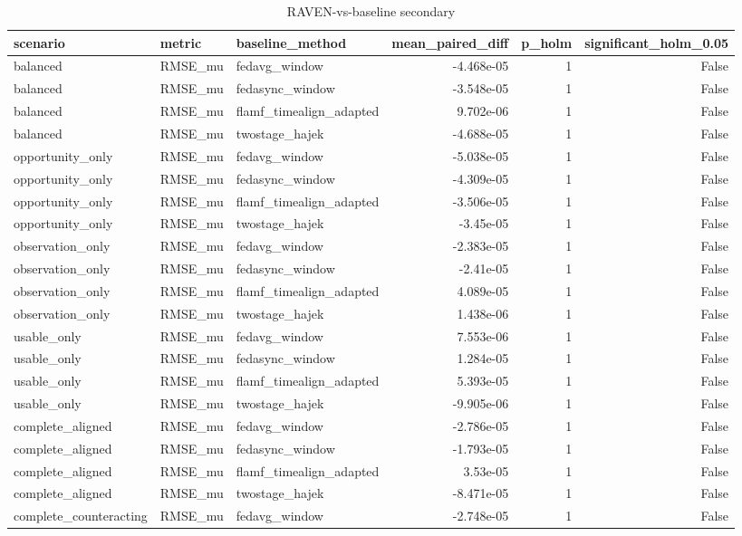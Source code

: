 \begin{table}
\caption{RAVEN-vs-baseline secondary}
\label{tab:table_e2f}
\begin{tabular}{lllrrr}
\toprule
scenario & metric & baseline_method & mean_paired_diff & p_holm & significant_holm_0.05 \\
\midrule
balanced & RMSE_mu & fedavg_window & -4.468e-05 & 1 & False \\
balanced & RMSE_mu & fedasync_window & -3.548e-05 & 1 & False \\
balanced & RMSE_mu & flamf_timealign_adapted & 9.702e-06 & 1 & False \\
balanced & RMSE_mu & twostage_hajek & -4.688e-05 & 1 & False \\
opportunity_only & RMSE_mu & fedavg_window & -5.038e-05 & 1 & False \\
opportunity_only & RMSE_mu & fedasync_window & -4.309e-05 & 1 & False \\
opportunity_only & RMSE_mu & flamf_timealign_adapted & -3.506e-05 & 1 & False \\
opportunity_only & RMSE_mu & twostage_hajek & -3.45e-05 & 1 & False \\
observation_only & RMSE_mu & fedavg_window & -2.383e-05 & 1 & False \\
observation_only & RMSE_mu & fedasync_window & -2.41e-05 & 1 & False \\
observation_only & RMSE_mu & flamf_timealign_adapted & 4.089e-05 & 1 & False \\
observation_only & RMSE_mu & twostage_hajek & 1.438e-06 & 1 & False \\
usable_only & RMSE_mu & fedavg_window & 7.553e-06 & 1 & False \\
usable_only & RMSE_mu & fedasync_window & 1.284e-05 & 1 & False \\
usable_only & RMSE_mu & flamf_timealign_adapted & 5.393e-05 & 1 & False \\
usable_only & RMSE_mu & twostage_hajek & -9.905e-06 & 1 & False \\
complete_aligned & RMSE_mu & fedavg_window & -2.786e-05 & 1 & False \\
complete_aligned & RMSE_mu & fedasync_window & -1.793e-05 & 1 & False \\
complete_aligned & RMSE_mu & flamf_timealign_adapted & 3.53e-05 & 1 & False \\
complete_aligned & RMSE_mu & twostage_hajek & -8.471e-05 & 1 & False \\
complete_counteracting & RMSE_mu & fedavg_window & -2.748e-05 & 1 & False \\

\end{tabular}
\end{table}
